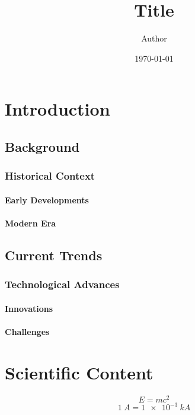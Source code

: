 \documentclass[ensem,french]{myreport}
\title{Title}
\author{Author}
\date{\today}
\begin{document}
\tableofcontents
\newpage

\chapter{Introduction}
\lipsum[1-2]

\section{Background}
\lipsum[3-4]

\subsection{Historical Context}
\lipsum[5-6]

\subsubsection{Early Developments}
\lipsum[7-8]

\subsubsection{Modern Era}
\lipsum[9-10]

\section{Current Trends}
\lipsum[11-12]

\subsection{Technological Advances}
\lipsum[13-14]

\subsubsection{Innovations}
\lipsum[15-16]

\subsubsection{Challenges}
\lipsum[17-18]

\chapter{Scientific Content}
\lipsum[19-20]
\begin{equation}
    E = mc^2
\end{equation}
\begin{equation}
    \SI{1}{A} = \SI{1e-3}{kA}           %
\end{equation}
\end{document}
